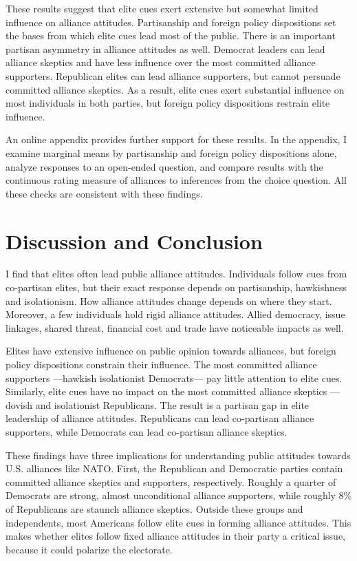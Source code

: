 \documentclass[12pt]{article}
\begin{document}
These results suggest that elite cues exert extensive but somewhat limited influence on alliance attitudes.
Partisanship and foreign policy dispositions set the bases from which elite cues lead most of the public. 
There is an important partisan asymmetry in alliance attitudes as well. 
Democrat leaders can lead alliance skeptics and have less influence over the most committed alliance supporters. 
Republican elites can lead alliance supporters, but cannot persuade committed alliance skeptics. 
As a result, elite cues exert substantial influence on most individuals in both parties, but foreign policy dispositions restrain elite influence. 


An online appendix provides further support for these results. 
In the appendix, I examine marginal means by partisanship and foreign policy dispositions alone, analyze responses to an open-ended question, and compare results with the continuous rating measure of alliances to inferences from the choice question.
All these checks are consistent with these findings. 


\section{Discussion and Conclusion} 


I find that elites often lead public alliance attitudes.  
Individuals follow cues from co-partisan elites, but their exact response depends on partisanship, hawkishness and isolationism. 
How alliance attitudes change depends on where they start.
Moreover, a few individuals hold rigid alliance attitudes. 
Allied democracy, issue linkages, shared threat, financial cost and trade have noticeable impacts as well.  


Elites have extensive influence on public opinion towards alliances, but foreign policy dispositions constrain their influence. 
The most committed alliance supporters ---hawkish isolationist Democrats--- pay little attention to elite cues.
Similarly, elite cues have no impact on the most committed alliance skeptics --- dovish and isolationist Republicans. 
The result is a partisan gap in elite leadership of alliance attitudes. 
Republicans can lead co-partisan alliance supporters, while Democrats can lead co-partisan alliance skeptics. 


These findings have three implications for understanding public attitudes towards U.S. alliances like NATO. 
First, the Republican and Democratic parties contain committed alliance skeptics and supporters, respectively.
Roughly a quarter of Democrats are strong, almost unconditional alliance supporters, while roughly 8\% of Republicans are staunch alliance skeptics.
Outside these groups and independents, most Americans follow elite cues in forming alliance attitudes. 
This makes whether elites follow fixed alliance attitudes in their party a critical issue, because it could polarize the electorate.  
\end{document}
